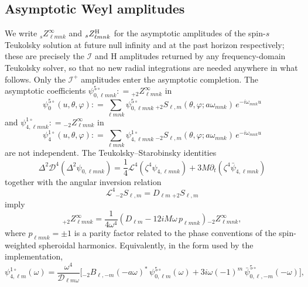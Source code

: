 \documentclass[preprint,aps,nofootinbib,a4paper,superscriptaddress,longbibliography,amsfonts, amssymb,amsmath,titlepage]{revtex4-1}
\numberwithin{equation}{section} %
\newcommand{\emm}{m}
\def\l{\ensuremath{\ell}}
\def\pd{\partial}
\def\pd{\partial}
\def\beq{\begin{equation}}
\def\eeq{\end{equation}}
\def\beq{\begin{equation}}
\def\eeq{\end{equation}}
\newcommand{\BcoK}[3]{{}_{#1}B_{#2}(#3)}            %
\def\Dlw{\mathcal{D}_{\l\emm\omega}}                %
\newcommand{\Zinf}[2]{{}_{#1}Z^{\infty}_{#2}}
\newcommand{\Zhor}[2]{{}_{#1}Z^{\rm H}_{#2}}
\def\psifive{\psi^{5\circ}_{0}}
\def\psifourone{\psi^{1\circ}_{4}}
\newcommand{\psifiveM}[1]{\psi^{5\circ}_{0,#1}}       %
\newcommand{\psifouroneM}[1]{\psi^{1\circ}_{4,#1}}
\def\lmnk{\l \emm n k}
\def\wmnk{\omega_{\emm n k}}
\newcommand{\sSS}[3]{{}_{#1}S_{#2,#3}}
\def\scri{\mathscr{I}^{+}}
\def\defeq{\mathrel{\mathop{:}}=}
\begin{document}
\subsection{Asymptotic Weyl amplitudes}
\label{sec:weyl amplitudes}
We write $\Zinf{s}{\lmnk}$ and $\Zhor{s}{\lmnk}$ for
the asymptotic amplitudes of the spin-$s$ Teukolsky solution at future null
infinity and at the past horizon respectively; these are precisely the
$\mathscr I$ and $\mathrm H$ amplitudes returned by any frequency-domain
Teukolsky solver, so that no new radial integrations are needed anywhere in
what follows.  Only the $\scri$ amplitudes enter the asymptotic completion.
The asymptotic coefficients
$\psifiveM{\lmnk}\defeq\Zinf{+2}{\lmnk}$ in
\beq\label{eq:psi0 5o expansion}
\psifive(u,\theta,\varphi) \defeq
 	\sum_{\lmnk}
	  \psifiveM{\lmnk}\,
	 \sSS{+2}{\l}{\emm}(\theta,\varphi;a\wmnk)\,
	 e^{-i\wmnk u}
\eeq
and $\psifouroneM{\lmnk}\defeq\Zinf{-2}{\lmnk}$ in
\beq\label{eq:psi4 1o expansion}
\psifourone(u,\theta,\varphi)  \defeq
	\sum_{\lmnk}
	 \psifouroneM{\lmnk}\,
	 \sSS{-2}{\l}{\emm}(\theta,\varphi;a\wmnk)\,
	  e^{-i\wmnk u}
\eeq
are not independent.  The Teukolsky--Starobinsky identities
\beq \label{eq:TS NP form}
\Delta^{2} \mathcal D^4 (\Delta^{2}\psi_{0,\lmnk}) =
	\frac{1}{4}\mathcal L^{4}(\zeta^{4}\psi_{4,\lmnk})
	+ 3 M \pd_{t}(\zeta^{4}\bar\psi_{4,\lmnk})
\eeq
together with the angular inversion relation
\beq\label{eq:L4 on S}
\mathcal L^{4} \sSS{-2}{\l}{\emm} = D_{\l\emm} \, \sSS{+2}{\l}{\emm}
\eeq
imply
\beq\label{eq:Zplus from Zminus}
\Zinf{+2}{\lmnk} =
	\frac{1}{4 \omega^{4}}
	\left(
	D_{\l\emm}-12iM\omega\, p_{\lmnk}
	\right)
	\Zinf{-2}{\lmnk},
\eeq
where $p_{\lmnk}=\pm1$ is a parity factor related to the phase conventions of
the spin-weighted spheroidal harmonics.
Equivalently, in the form used by the implementation,
\begin{equation}\label{eq:psi4 from psi0}
\psifouroneM{\l\emm}(\omega)
=
\frac{\omega^{4}}{\Dlw}
\Big[
\BcoK{-2}{\l,-\emm}{-a\omega}^{\!*}\,\psifiveM{\l\emm}(\omega)
+3i\omega(-1)^{\emm}\,\bar\psi^{5\circ}_{0,\l,-\emm}(-\omega)
\Big],
\end{equation}
\end{document}
